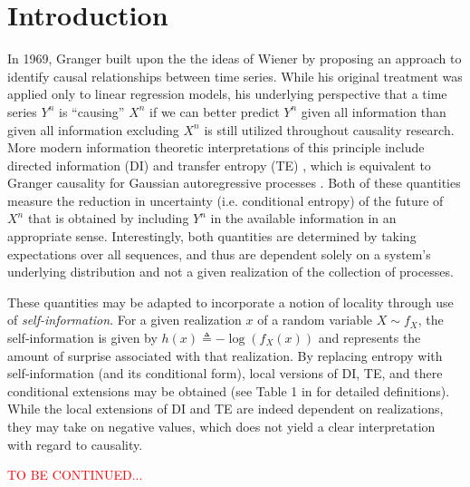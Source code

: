 \section{Introduction}

\begin{comment}
- Granger Causality
- Directed Information
- Transfer Entropy
- Local Transfer Entropy
- Sequential Prediction
- Argument for why sample path causality is important. Perhaps a neuroscientific argument that even if the model is time invariant, there may be certain patterns that induce a greater level of causal influence.
\end{itemize}}
\end{comment}

In 1969, Granger \cite{granger1969investigating} built upon the the ideas of Wiener by proposing an approach to identify causal relationships between time series. While his original treatment was applied only to linear regression models, his underlying perspective that a time series $Y^n$ is ``causing'' $X^n$ if we can better predict $Y^n$ given all information than given all information excluding $X^n$ is still utilized throughout causality research. More modern information theoretic interpretations of this principle include directed information (DI) \cite{marko1973bidirectional,massey1990causality} and transfer entropy (TE) \cite{schreiber2000measuring}, which is equivalent to Granger causality for Gaussian autoregressive processes \cite{barnett2009granger}. Both of these quantities measure the reduction in uncertainty (i.e. conditional entropy) of the future of $X^n$ that is obtained by including $Y^n$ in the available information in an appropriate sense. Interestingly, both quantities are determined by taking expectations over all sequences, and thus are dependent solely on a system's underlying distribution and not a given realization of the collection of processes.

These quantities may be adapted to incorporate a notion of locality through use of \emph{self-information}. For a given realization $x$ of a random variable $X\sim f_X$, the self-information is given by $h(x) \triangleq -\log(f_X(x))$ and represents the amount of surprise associated with that realization. By replacing entropy with self-information (and its conditional form), local versions of DI, TE, and there conditional extensions may be obtained (see Table 1 in \cite{lizier2014jidt} for detailed definitions). While the local extensions of DI and TE are indeed dependent on realizations, they may take on negative values, which does not yield a clear interpretation with regard to causality.

\textcolor{red}{TO BE CONTINUED...}